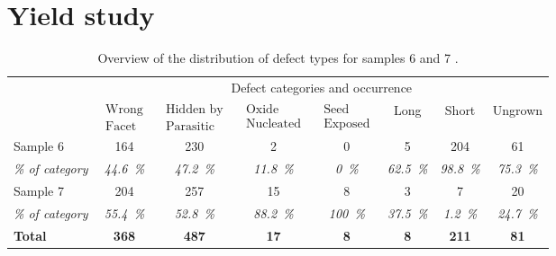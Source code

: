\section{Yield study}

\begin{table}
    \centering
    \caption[Overview of the distribution of defect types for samples 6 and 7.]{Overview of the distribution of defect types for samples 6 and 7 \cite{Brugnolotto2023_2}.}
    \begin{tabular}{l|ccccccc}
        \hline
         & \multicolumn{7}{c}{Defect categories and occurrence} \\ 
         & $\begin{matrix} \text{Wrong} \\ \text{Facet} \end{matrix}$ & $\begin{matrix} \text{Hidden by} \\ \text{Parasitic} \end{matrix}$ & $\begin{matrix} \text{Oxide} \\ \text{Nucleated} \end{matrix}$ & $\begin{matrix} \text{Seed} \\ \text{Exposed} \end{matrix}$ & Long & Short & Ungrown \\ 
        \hline \hline
        Sample 6 & \num{164} & \num{230} & \num{2} & \num{0} & \num{5} & \num{204} & \num{61} \\ 
        \textit{\% of category} & \textit{\qty{44.6}{\%}} & \textit{\qty{47.2}{\%}} & \textit{\qty{11.8}{\%}} & \textit{\qty{0}{\percent}} & \textit{\qty{62.5}{\%}} & \textit{\qty{98.8}{\%}} & \textit{\qty{75.3}{\%}} \\ 
        \hline
        Sample 7 & \num{204} & \num{257} & \num{15} & \num{8} & \num{3} & \num{7} & \num{20} \\ 
        \textit{\% of category} & \textit{\qty{55.4}{\%}} & \textit{\qty{52.8}{\%}} & \textit{\qty{88.2}{\%}} & \textit{\qty{100}{\%}} & \textit{\qty{37.5}{\%}} & \textit{\qty{1.2}{\%}} & \textit{\qty{24,7}{\%}} \\ 
        \hline
        \textbf{Total} & \textbf{\num{368}} & \textbf{\num{487}} & \textbf{\num{17}} & \textbf{\num{8}} & \textbf{\num{8}} & \textbf{\num{211}} & \textbf{\num{81}} \\
        \hline
    \end{tabular}
    \label{tab:defects_overview}
\end{table}

